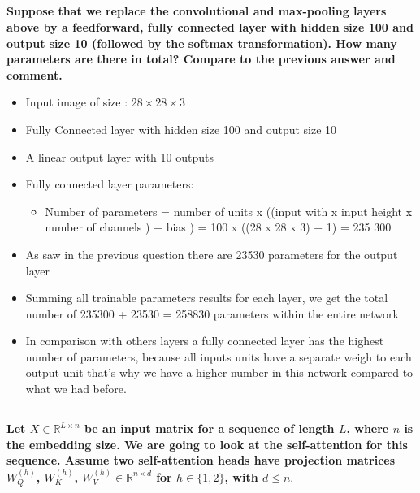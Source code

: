 \documentclass{article}
\begin{document}
\subsection{}
\textbf{Suppose that we replace the convolutional and max-pooling layers above by a feedforward, fully connected layer with hidden size 100 and output size 10 (followed by the softmax transformation). How many parameters are there in total? Compare to the previous answer and comment.}
\begin{itemize}
    \item Input image of size : $28 \times 28 \times 3$
    \item Fully Connected layer with hidden size 100 and output size 10
    \item A linear output layer with 10 outputs
    \item Fully connected layer parameters:
        \begin{itemize}
            \item Number of parameters = number of units x ((input with x input height x number of channels ) + bias )
            = 100 x ((28 x 28 x 3) + 1) = 235 300
        \end{itemize}
    \item As saw in the previous question there are 23530 parameters for the output layer
    \item Summing all trainable parameters results for each layer, we get the total number of 235300 + 23530 = 258830  parameters within  the entire network
    \item In comparison with others layers a fully connected layer has the highest number of parameters, because all inputs units have a separate weigh to each output unit that's why we have a higher number in this network compared to what we had before.
\end{itemize}




\subsection{}
\textbf{Let $X \in \mathbb{R}^{L \times n}$ be an input matrix for a sequence of length $L$, where $n$ is the embedding size. We are going to look at the self-attention for this sequence. Assume two self-attention heads have projection matrices $W^{(h)}_Q$, $W^{(h)}_K$, $W^{(h)}_V \in \mathbb{R}^{n \times d}$ for $h \in \{1, 2\}$, with $d \leq n$}.
\end{document}
